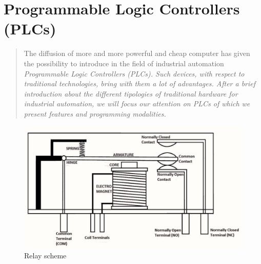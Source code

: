 \chapter{Programmable Logic Controllers (PLCs)}
\begin{quotation}
    \noindent\textsf{ The diffusion of more and more powerful and cheap computer has given the possibility to introduce in the field of industrial automation \textit{Programmable Logic Controllers (PLCs). Such devices, with respect to traditional technologies, bring with them a lot of advantages. After a brief introduction about the different tipologies of traditional hardware for industrial automation, we will focus our attention on PLCs of which we present features and programming modalities.}}
\end{quotation}
\minitoc

\begin{figure}[h]
    \centering
    \includegraphics[scale=0.4]{img/relay_scheme.jpg}
    \caption{Relay scheme }    
\end{figure}
\vspace{-0.5cm}
